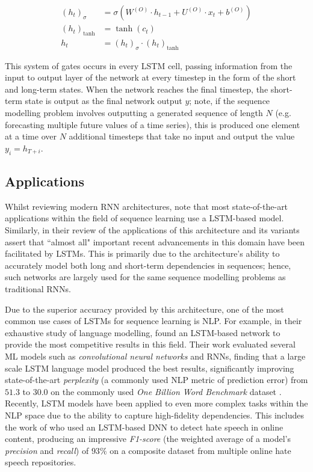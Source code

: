 \documentclass[a4paper, 11pt]{report}
\begin{document}
    \begin{align}
        \label{eq: output-gate}
        (h_t)_{\sigma} &= \sigma( W^{(O)} \cdot h_{t-1} + U^{(O)} \cdot x_t + b^{(O)} ) \\
        (h_t)_{\tanh} &= \tanh{( c_t )} \\
        h_t &= (h_t)_{\sigma} \cdot (h_t)_{\tanh}
    \end{align}

    This system of gates occurs in every LSTM cell, passing information from the input to output layer of the network at every timestep in the form of the short and long-term states. When the network reaches the final timestep, the short-term state is output as the final network output $y$; note, if the sequence modelling problem involves outputting a generated sequence of length $N$ (e.g. forecasting multiple future values of a time series), this is produced one element at a time over $N$ additional timesteps that take no input and output the value $y_i = h_{T+i}$.


    \subsection{Applications}

    Whilst reviewing modern RNN architectures, \citet{lipton-2015} note that most state-of-the-art applications within the field of sequence learning use a LSTM-based model. Similarly,  in their review of the applications of this architecture and its variants \citet{yu-2019} assert that ``almost all" important recent advancements in this domain have been facilitated by LSTMs. This is primarily due to the architecture's ability to accurately model both long and short-term dependencies in sequences; hence, such networks are largely used for the same sequence modelling problems as traditional RNNs. 

    Due to the superior accuracy provided by this architecture, one of the most common use cases of LSTMs for sequence learning is NLP. For example, in their exhaustive study of language modelling, \citet{jozefowicz-2016} found an LSTM-based network to provide the most competitive results in this field. Their work evaluated several ML models such as \emph{convolutional neural networks} and RNNs, finding that a large scale LSTM language model produced the best results, significantly improving state-of-the-art \emph{perplexity} (a commonly used NLP metric of prediction error) from $51.3$ to $30.0$ on the commonly used \emph{One Billion Word Benchmark} dataset \citep{chelba-2013}. Recently, LSTM models have been applied to even more complex tasks within the NLP space due to the ability to capture high-fidelity dependencies. This includes the work of \citet{saleh-2021} who used an LSTM-based DNN to detect hate speech in online content, producing an impressive \emph{F1-score} (the weighted average of a model's \emph{precision} and \emph{recall}) of $93\%$ on a composite dataset from multiple online hate speech repositories.
\end{document}
